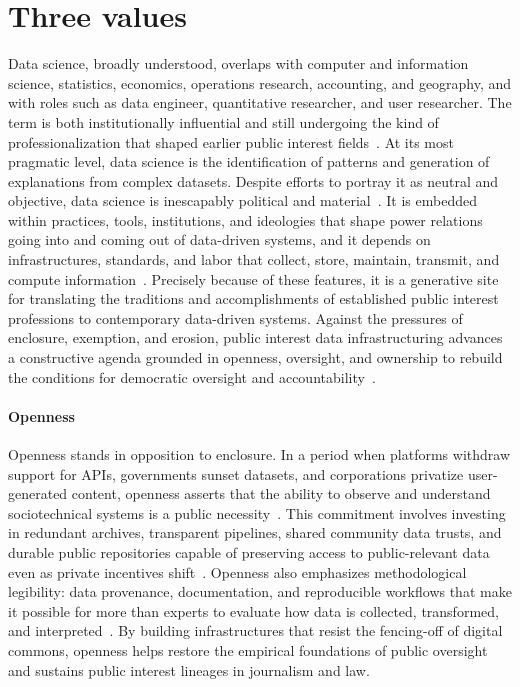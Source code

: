 \documentclass[acmsmall,screen]{acmart}
\begin{document}
\section*{Three values}
Data science, broadly understood, overlaps with computer and information science, statistics, economics, operations research, accounting, and geography, and with roles such as data engineer, quantitative researcher, and user researcher. The term is both institutionally influential and still undergoing the kind of professionalization that shaped earlier public interest fields~\cite{passiTrustDataScience2018a,greenDataSciencePolitical2021}. At its most pragmatic level, data science is the identification of patterns and generation of explanations from complex datasets. Despite efforts to portray it as neutral and objective, data science is inescapably political and material~\cite{boydCriticalQuestionsBig2012,vandijckDataficationDataismDataveillance2014}. It is embedded within practices, tools, institutions, and ideologies that shape power relations going into and coming out of data-driven systems, and it depends on infrastructures, standards, and labor that collect, store, maintain, transmit, and compute information~\cite{thomerRelationalDataParadigms2020,acker_DataCraftTheory_2019}. Precisely because of these features, it is a generative site for translating the traditions and accomplishments of established public interest professions to contemporary data-driven systems. Against the pressures of enclosure, exemption, and erosion, public interest data infrastructuring advances a constructive agenda grounded in openness, oversight, and ownership to rebuild the conditions for democratic oversight and accountability~\cite{hutchinsonAccountabilityMachineLearning2021,pasquale_black_2016}.

\paragraph*{Openness}
Openness stands in opposition to enclosure. In a period when platforms withdraw support for APIs, governments sunset datasets, and corporations privatize user-generated content, openness asserts that the ability to observe and understand sociotechnical systems is a public necessity~\cite{Freelon_ComputationalResearchPostAPI_2018,Bruns_APIcalypsesocialmedia_2019}. This commitment involves investing in redundant archives, transparent pipelines, shared community data trusts, and durable public repositories capable of preserving access to public-relevant data even as private incentives shift~\cite{schwartz_archives_2002,acker_DataCraftTheory_2019}. Openness also emphasizes methodological legibility: data provenance, documentation, and reproducible workflows that make it possible for more than experts to evaluate how data is collected, transformed, and interpreted~\cite{thomerRelationalDataParadigms2020,passiTrustDataScience2018a}. By building infrastructures that resist the fencing-off of digital commons, openness helps restore the empirical foundations of public oversight and sustains public interest lineages in journalism and law.
\end{document}
